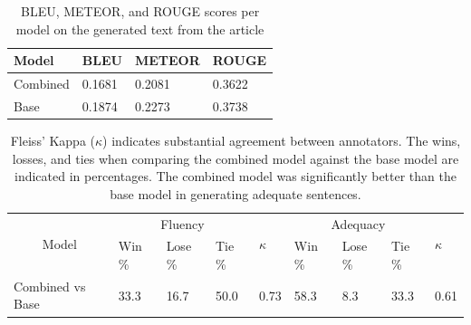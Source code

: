 \documentclass[
hf, %
]{ceurart}
\begin{document}
\begin{table}[]
	\caption{BLEU, METEOR, and ROUGE scores per model on the generated text from the article}
	\centering
	\begin{tabular}{|l|l|l|l|}
		\hline
		\textbf{Model} & \textbf{BLEU} & \textbf{METEOR} & \textbf{ROUGE} \\ \hline
		Combined       & 0.1681        & 0.2081          & 0.3622         \\ \hline
		Base           & 0.1874        & 0.2273          & 0.3738         \\ \hline
	\end{tabular}

	\label{tab:article_auto_metrics}
\end{table}


\begin{table}[ht]
	\caption{Fleiss' Kappa ($\kappa$) indicates substantial agreement between annotators. The wins, losses, and ties when comparing the combined model against the base model are indicated in percentages. The combined model was significantly better than the base model in generating adequate sentences.}

	\centering
	\begin{tabular}{|c|lll|l|lll|l|}
		\hline
		\multirow{2}{*}{Model}                 & \multicolumn{3}{c|}{Fluency} & \multirow{2}{*}{$\kappa$}    & \multicolumn{3}{c|}{Adequacy} & \multirow{2}{*}{$\kappa$}                                                                              \\ \cline{2-4} \cline{6-8}
		                                       & \multicolumn{1}{l|}{Win \%}  & \multicolumn{1}{l|}{Lose \%} & Tie \%                        &                           & \multicolumn{1}{l|}{Win \%} & \multicolumn{1}{l|}{Lose \%} & Tie \% &      \\ \hline
		\multicolumn{1}{|l|}{Combined vs Base} & \multicolumn{1}{l|}{33.3}    & \multicolumn{1}{l|}{16.7}    & 50.0                          & 0.73                      & \multicolumn{1}{l|}{58.3}   & \multicolumn{1}{l|}{8.3}     & 33.3   & 0.61 \\ \hline
	\end{tabular}
	\label{tab:article_annotations}
\end{table}
\end{document}
